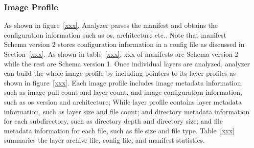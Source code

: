 \subsubsection{Image Profile}

As shown in figure~\ref{xxx}, Analyzer parses the manifest and obtains the configuration information such as os, architecture etc..
%
Note that manifest Schema version 2 stores configuration information in a config file as discussed in Section~\ref{xxx}.
%
As shown in table~\ref{xxx}, xxx of manifests are Schema version 2 while the rest are Schema version 1. 
%
Once individual layers are analyzed, analyzer can build the whole image profile by including pointers to its layer profiles as shown in figure~\ref{xxx}. Each image profile includes image metadata information, such as image pull count and layer count, and image configuration information, such as os version and architecture; While layer profile contains layer metadata information, such as layer size and file count; and directory metadata information for each subdirectory, such as directory depth and directory size; and file metadata information for each file, such as file size and file type.
%
Table~\ref{xxx} summaries the layer archive file, config file, and manifest statistics.



